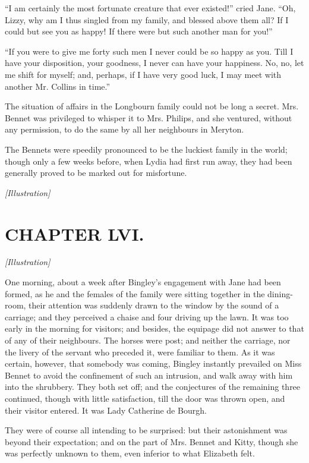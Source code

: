 \documentclass[12pt]{book}
\begin{document}
``I am certainly the most fortunate creature that ever existed!'' cried Jane. ``Oh, Lizzy, why am I thus singled from my family, and blessed above them all? If I could but see you as happy! If there were but such another man for you!''

``If you were to give me forty such men I never could be so happy as you. Till I have your disposition, your goodness, I never can have your happiness. No, no, let me shift for myself; and, perhaps, if I have very good luck, I may meet with another Mr. Collins in time.''

The situation of affairs in the Longbourn family could not be long a secret. Mrs. Bennet was privileged to whisper it to Mrs. Philips, and she ventured, without any permission, to do the same by all her neighbours in Meryton.

The Bennets were speedily pronounced to be the luckiest family in the world; though only a few weeks before, when Lydia had first run away, they had been generally proved to be marked out for misfortune.

\emph{[Illustration]}

\chapter{CHAPTER LVI.}

\emph{[Illustration]}

One morning, about a week after Bingley's engagement with Jane had been formed, as he and the females of the family were sitting together in the dining-room, their attention was suddenly drawn to the window by the sound of a carriage; and they perceived a chaise and four driving up the lawn. It was too early in the morning for visitors; and besides, the equipage did not answer to that of any of their neighbours. The horses were post; and neither the carriage, nor the livery of the servant who preceded it, were familiar to them. As it was certain, however, that somebody was coming, Bingley instantly prevailed on Miss Bennet to avoid the confinement of such an intrusion, and walk away with him into the shrubbery. They both set off; and the conjectures of the remaining three continued, though with little satisfaction, till the door was thrown open, and their visitor entered. It was Lady Catherine de Bourgh.

They were of course all intending to be surprised: but their astonishment was beyond their expectation; and on the part of Mrs. Bennet and Kitty, though she was perfectly unknown to them, even inferior to what Elizabeth felt.
\end{document}
